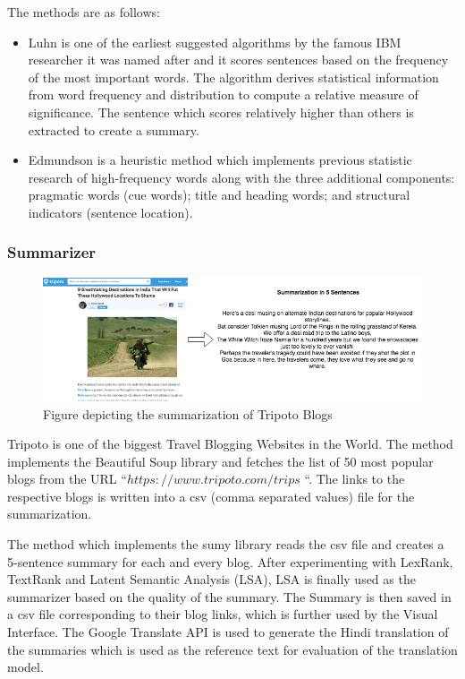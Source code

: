 The methods are as follows: 

\begin{itemize}
    \item Luhn is one of the earliest suggested algorithms by the famous IBM researcher it was named after and it scores sentences based on the frequency of the most important words. The algorithm derives statistical information from word frequency and distribution to compute a relative measure of significance. The sentence which scores relatively higher than others is extracted to create a summary. 
    \item Edmundson is a heuristic method which implements previous statistic research of high-frequency words along with the three additional components: pragmatic words (cue words); title and heading words; and structural indicators (sentence location). 
    
\end{itemize}

\subsubsection{Summarizer}

\begin{figure}
\includegraphics[width=\textwidth]{figures/textsummary.png}
\caption{Figure depicting the summarization of Tripoto Blogs} \label{fig1}
\end{figure}
Tripoto is one of the biggest Travel Blogging Websites in the World. The method implements the Beautiful Soup library and fetches the list of 50 most popular blogs from the URL “$https://www.tripoto.com/trips$ “. The links to the respective blogs is written into a csv (comma separated values) file for the summarization.

The method which implements the sumy library reads the csv file and creates a 5-sentence summary for each and every blog. After experimenting with LexRank, TextRank and Latent Semantic Analysis (LSA), LSA is finally used as the summarizer based on the quality of the summary. The Summary is then saved in a csv file corresponding to their blog links, which is further used by the Visual Interface. The Google Translate API is used to generate the Hindi translation of the summaries which is used as the reference text for evaluation of the translation model.


